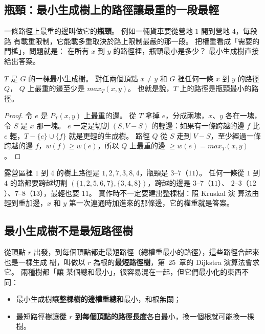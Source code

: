 \subsection{瓶頸：最小生成樹上的路徑讓最重的一段最輕}
\label{sec:mst-bottleneck}

一條路徑上最重的邊叫做它的\textbf{瓶頸}。 例如一輛貨車要從營地 $1$ 開到營地 $4$，每段路
有載重限制，它能載多重取決於路上限制最嚴的那一段。 把權重看成「需要的門檻」，問題就是：
在所有 $x$ 到 $y$ 的路徑裡，瓶頸最小是多少？ 最小生成樹直接給出答案。

\begin{theorem}
\label{thm:mst-bottleneck}
$T$ 是 $G$ 的一棵最小生成樹。 對任兩個頂點 $x \ne y$ 和 $G$ 裡任何一條 $x$ 到 $y$ 的路徑 $Q$，
$Q$ 上最重的邊至少是 $\mathit{max}_T(x, y)$。 也就是說，$T$ 上的路徑是瓶頸最小的路徑。
\end{theorem}

\begin{proof}
令 $e$ 是 $P_T(x, y)$ 上最重的邊。 從 $T$ 拿掉 $e$，分成兩塊，$x$、$y$ 各在一塊，令 $S$ 是 $x$
那一塊。 $e$ 一定是切割 $(S, V - S)$ 的輕邊：如果有一條跨越的邊 $f$ 比 $e$ 輕，$T - \{e\}
\cup \{f\}$ 就是更輕的生成樹。 路徑 $Q$ 從 $S$ 走到 $V - S$，至少經過一條跨越的邊 $f$，$w(f)
\ge w(e)$，所以 $Q$ 上最重的邊 $\ge w(e) = \mathit{max}_T(x, y)$。
\end{proof}

露營區裡 $1$ 到 $4$ 的樹上路徑是 $1, 2, 7, 3, 8, 4$，瓶頸是 $3$--$7$（$11$）。 任何一條從 $1$
到 $4$ 的路都要跨越切割 $(\{1, 2, 5, 6, 7\}, \{3, 4, 8\})$，跨越的邊是 $3$--$7$（$11$）、
$2$--$3$（$12$）、$7$--$8$（$13$），最輕也要 $11$。 實作時不一定要建出整棵樹：照 Kruskal 演
算法由輕到重加邊，$x$ 和 $y$ 第一次連通時加進來的那條邊，它的權重就是答案。

\subsection{最小生成樹不是最短路徑樹}
\label{sec:mst-spt}

從頂點 $r$ 出發，到每個頂點都走最短路徑（總權重最小的路徑），這些路徑合起來也是一棵生成
樹，叫做以 $r$ 為根的\textbf{最短路徑樹}，第~25~章的 Dijkstra 演算法會求它。 兩種樹都「讓
某個總和最小」，很容易混在一起，但它們最小化的東西不同：

\begin{itemize}
\item 最小生成樹讓\textbf{整棵樹的邊權重總和}最小，和根無關；
\item 最短路徑樹讓\textbf{從 $r$ 到每個頂點的路徑長度}各自最小，換一個根就可能換一棵樹。
\end{itemize}

